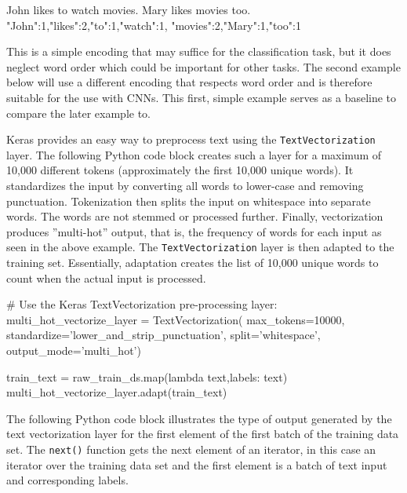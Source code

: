 \begin{samepage}
\begin{textcode}
John likes to watch movies. Mary likes movies too.
{"John":1,"likes":2,"to":1,"watch":1, "movies":2,"Mary":1,"too":1}
\end{textcode}
\end{samepage}

This is a simple encoding that may suffice for the classification task, but it does neglect word order which could be important for other tasks. The second example below will use a different encoding that respects word order and is therefore suitable for the use with CNNs. This first, simple example serves as a baseline to compare the later example to.

Keras provides an easy way to preprocess text using the \texttt{TextVectorization} layer. The following Python code block creates such a layer for a maximum of 10,000 different tokens (approximately the first 10,000 unique words). It standardizes the input by converting all words to lower-case and removing punctuation. Tokenization then splits the input on whitespace into separate words. The words are not stemmed or processed further. Finally, vectorization produces ''multi-hot'' output, that is, the frequency of words for each input as seen in the above example. The \texttt{TextVectorization} layer is then adapted to the training set. Essentially, adaptation creates the list of 10,000 unique words to count when the actual input is processed.

\begin{samepage}
\begin{pythoncode}
# Use the Keras TextVectorization pre-processing layer:
multi_hot_vectorize_layer = TextVectorization(
    max_tokens=10000,
    standardize='lower_and_strip_punctuation',
    split='whitespace',
    output_mode='multi_hot')
    
train_text = raw_train_ds.map(lambda text,labels: text)
multi_hot_vectorize_layer.adapt(train_text)
\end{pythoncode}
\end{samepage}

The following Python code block illustrates the type of output generated by the text vectorization layer for the first element of the first batch of the training data set. The \texttt{next()} function gets the next element of an iterator, in this case an iterator over the training data set and the first element is a batch of text input and corresponding labels.

